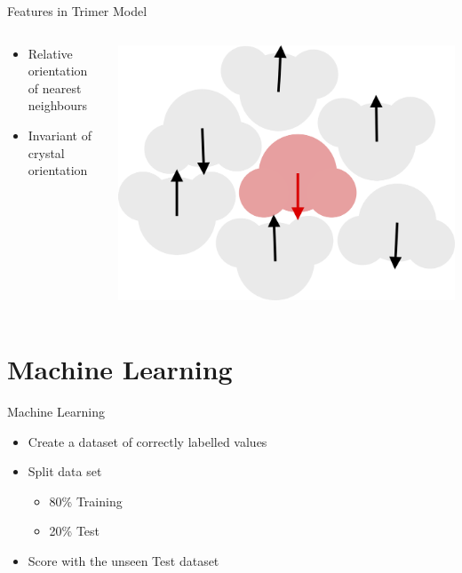 \documentclass[aspectratio=169, 14pt]{beamer}
\begin{document}
\begin{frame}{Features in Trimer Model}

  \begin{columns}
    \begin{column}{0.5\textwidth}
      \begin{itemize}
        \item Relative orientation of nearest neighbours
        \item Invariant of crystal orientation
      \end{itemize}
    \end{column}
    \begin{column}{0.5\textwidth}
      \includegraphics[width=\textwidth]{orientations.png}
    \end{column}
  \end{columns}
\end{frame}


\section{Machine Learning}
\begin{frame}{Machine Learning}

  \begin{itemize}
    \item Create a dataset of correctly labelled values
    \item Split data set
      \begin{itemize}
        \item 80\% Training
        \item 20\% Test
      \end{itemize}
    \item Score with the unseen Test dataset
  \end{itemize}

\end{frame}
\end{document}
